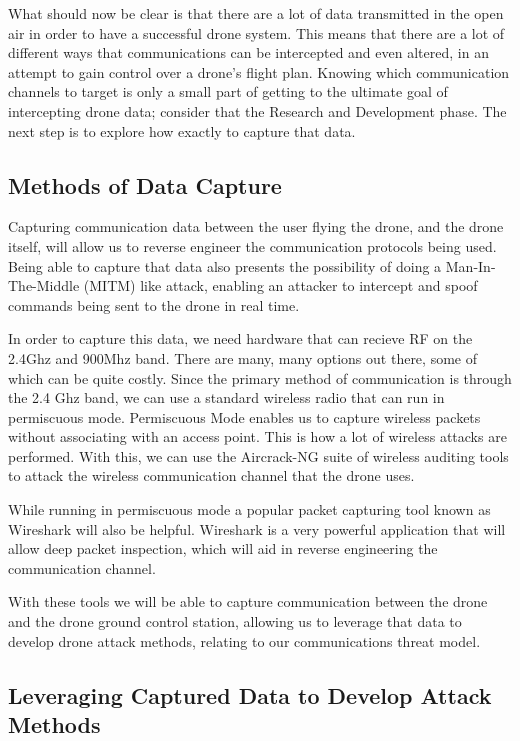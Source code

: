 \documentclass[IEEEtran,letterpaper,10pt,titlepage,draftclsnofoot,onecolumn]{article}
\begin{document}
What should now be clear is that there are a lot of data transmitted in the open air in order to have a successful
drone system. This means that there are a lot of different ways that communications can be intercepted and even
altered, in an attempt to gain control over a drone's flight plan. Knowing which communication channels to target
is only a small part of getting to the ultimate goal of intercepting drone data; consider that the Research and
Development phase. The next step is to explore how exactly to capture that data.

\subsection*{Methods of Data Capture}
Capturing communication data between the user flying the drone, and the drone itself, will allow us to reverse engineer
the communication protocols being used. Being able to capture that data also presents the possibility of doing a
Man-In-The-Middle (MITM) like attack, enabling an attacker to intercept and spoof commands being sent to the drone
in real time.

In order to capture this data, we need hardware that can recieve RF on the 2.4Ghz and 900Mhz band. There are many, many
options out there, some of which can be quite costly. Since the primary method of communication is through the 2.4 Ghz
band, we can use a standard wireless radio that can run in permiscuous mode\cite{WiFiPerc}. Permiscuous Mode enables
us to capture wireless packets without associating with an access point. This is how a lot of wireless attacks are
performed\cite{WiFiPerc}. With this, we can use the Aircrack-NG suite of wireless auditing tools to attack the wireless
communication channel that the drone uses\cite{AircrackNG}.

While running in permiscuous mode a popular packet capturing tool known as Wireshark will also be helpful. Wireshark
is a very powerful application that will allow deep packet inspection, which will aid in reverse engineering the
communication channel\cite{WiFiPerc}.

With these tools we will be able to capture communication between the drone and the drone ground control station, allowing
us to leverage that data to develop drone attack methods, relating to our communications threat model.

\subsection*{Leveraging Captured Data to Develop Attack Methods}
\end{document}
